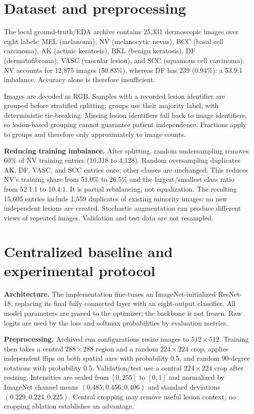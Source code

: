 \documentclass[10pt,a4paper]{article}
\begin{document}
\section{Dataset and preprocessing}
The local ground-truth/EDA archive contains 25,331 dermoscopic images over eight labels: MEL (melanoma), NV (melanocytic nevus), BCC (basal cell carcinoma), AK (actinic keratosis), BKL (benign keratosis), DF (dermatofibroma), VASC (vascular lesion), and SCC (squamous cell carcinoma). NV accounts for 12,875 images (50.83\%), whereas DF has 239 (0.94\%): a 53.9:1 imbalance. Accuracy alone is therefore insufficient.

Images are decoded as RGB. Samples with a recorded lesion identifier are grouped before stratified splitting; groups use their majority label, with deterministic tie-breaking. Missing lesion identifiers fall back to image identifiers, so lesion-based grouping cannot guarantee patient independence. Fractions apply to groups and therefore only approximately to image counts.

\textbf{Reducing training imbalance.} After splitting, random undersampling removes 60\% of NV training entries (10,318 to 4,128). Random oversampling duplicates AK, DF, VASC, and SCC entries once; other classes are unchanged. This reduces NV's training share from 51.0\% to 26.5\% and the largest/smallest class ratio from 52.1:1 to 10.4:1. It is partial rebalancing, not equalization. The resulting 15,605 entries include 1,559 duplicates of existing minority images; no new independent lesions are created. Stochastic augmentation can produce different views of repeated images. Validation and test data are not resampled.

\newpage
\section{Centralized baseline and experimental protocol}
\textbf{Architecture.} The implementation fine-tunes an ImageNet-initialized ResNet-18, replacing its final fully connected layer with an eight-output classifier. All model parameters are passed to the optimizer; the backbone is not frozen. Raw logits are used by the loss and softmax probabilities by evaluation metrics.

\textbf{Preprocessing.} Archived run configurations resize images to $512\times512$. Training then takes a central $288\times288$ region and a random $224\times224$ crop, applies independent flips on both spatial axes with probability 0.5, and random 90-degree rotations with probability 0.5. Validation/test use a central $224\times224$ crop after resizing. Intensities are scaled from $[0,255]$ to $[0,1]$ and normalized by ImageNet channel means $(0.485,0.456,0.406)$ and standard deviations $(0.229,0.224,0.225)$. Central cropping may remove useful lesion context; no cropping ablation establishes an advantage.
\end{document}

